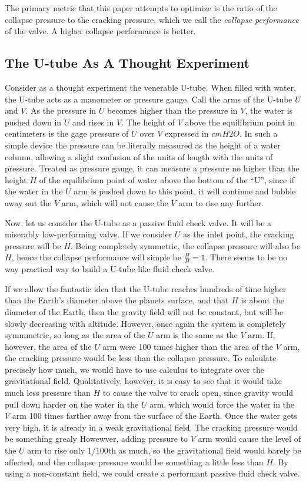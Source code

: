 \documentclass{asme2ej}
\begin{document}
The primary metric that this paper attempts to optimize is the ratio of the
collapse pressure to the cracking pressure, which we call the {\em collapse performance}
of the valve. A higher collapse performance is better.

\subsection{The U-tube As A Thought Experiment}

Consider as a thought experiment the venerable U-tube. When filled with water,
the U-tube acts as a manometer or pressure gauge. Call the arms of the U-tube
$U$ and $V$. As the pressure in $U$ becomes higher than the pressure in $V$,
the water is pushed down in $U$ and rises in $V$. The height of $V$ above
the equilibrium point in centimeters is the gage pressure of $U$ over $V$
expressed in $cmH2O$. In such a simple device the pressure can be literally
measured as the height of a water column, allowing a slight confusion
of the units of length with the units of pressure.
Treated as pressure gauge, it can measure a pressure
no higher than the height $H$ of the equilibrium point of water above the
bottom of the ``U'', since if the water in the $U$ arm is pushed down
to this point, it will continue and bubble away out the $V$ arm, which
will not cause the $V$ arm to rise any further.

Now, let us consider the U-tube as a passive fluid check valve.
It will be a miserably low-performing valve. If we consider $U$ as
the inlet point, the cracking pressure will be $H$. Being completely
symmetric, the collapse pressure will also be $H$, hence the collapse
performance will simple be $\frac{H}{H} = 1$. There seems to
be no way practical way to build a U-tube like fluid check valve.

If we allow the fantastic idea that the U-tube reaches hundreds of time
higher than the Earth's diameter above the
planets surface, and that $H$ is about the diameter of the Earth,
then the gravity field will not be constant, but will
be slowly decreasing with altitude. However, once again the system
is completely symmmetric, so long as the area of the $U$ arm is the same
as the $V$ arm. If, however, the area of the $U$ arm were 100 times higher
than the area of the $V$ arm, the cracking pressure would be less than
the collapse pressure. To calculate precisely how much, we would have to
use calculus to integrate over the gravitational field.
Qualitatively, however, it is easy to see that it would take much less pressure
than $H$ to cause the valve to crack open, since gravity would pull down harder
on the water in the $U$ arm, which would force the water in the $V$ arm
100 times farther away from the surface of the Earth.
Once the water gets very high, it is already in a weak gravitational field.
The cracking pressure would be something grealy
Howewver, adding pressure to $V$ arm would cause the level of the $U$ arm
to rise only 1/100th as much, so the gravitational field would barely
be affected, and the collapse pressure would be something a little less than $H$.
By using a non-constant field, we could create a performant passive fluid check valve.
\end{document}
